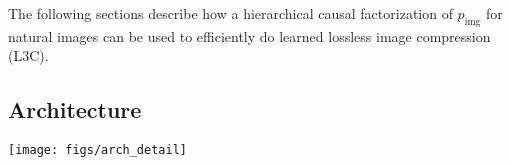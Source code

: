 \documentclass[10pt,twocolumn,letterpaper]{article}
\newcommand{\name}{L3C\xspace}
\begin{document}
The following sections describe how a hierarchical causal factorization of $p_\text{img}$ for natural images can be used to efficiently do learned lossless image compression (\name).

\subsection{Architecture} \label{sec:arch}

\begin{figure*}[ht!]
\centering
\texttt{[image: figs/arch\_detail]}
    \caption{Architecture details for a single scale $s$. For $s = 1$, $E_\text{in}^{(1)}$ is the RGB image $x$ normalized to $[-1, 1]$. All vertical \textbf{black} lines are convolutions, which have $C_f=64$ filters, except when denoted otherwise beneath. The convolutions are stride 1 with $3{\times}3$ filters, except when denoted otherwise above (using $sSf\kern-1.5ptF$ = stride $s$, filter $f$). We add the features $f^{(s+1)}$ from the predictor $D^{(s+1)}$ to those of the first layer of $D^{(s)}$ (a skip connection between scales). The gray blocks are residual blocks, shown once on the right side.
    $C$ is the number of channels of $z^{(s)}$, $C_p^{(s-1)}$ is the final number of channels, see Sec.~\ref{sec:mixture_model}.
    Special blocks are denoted in red: $U$ is pixelshuffling upsampling~\cite{Shi2016RealTimeSI}. $A*$ is the ``atrous convolution'' layer described in Sec.~\ref{sec:arch}.
    We use a heatmap to visualize $z^{(s)}$, see Sec.~\ref{sec:visualize_repr}.
    }
\label{fig:arch_detail}
\end{figure*}
\end{document}
